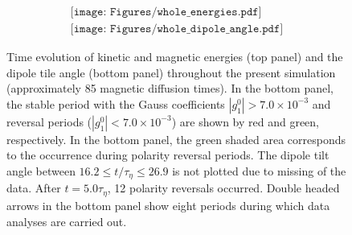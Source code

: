 \begin{figure}[ht]
\begin{center}
\[
\begin{array}{c}
\texttt{[image: Figures/whole\_energies.pdf]} \\
\texttt{[image: Figures/whole\_dipole\_angle.pdf]}
\end{array}
\]
\end{center}
\caption{
Time evolution of kinetic and magnetic energies (top panel) and the dipole tile angle (bottom panel) throughout the present simulation (approximately 85 magnetic diffusion times). In the bottom panel, the stable period with the Gauss coefficients $|g_{1}^{0}| > 7.0 \times 10^{-3}$ and reversal periods ($|g_{1}^{0}| < 7.0 \times 10^{-3}$) are shown by red and green, respectively. 
In the bottom panel, the green shaded area corresponds to the occurrence during polarity reversal periods.
The dipole tilt angle between $16.2 \le t / \tau_{\eta} \le 26.9$ is not plotted due to missing of the data. 
After $t = 5.0 \tau_{\eta}$, 12 polarity reversals occurred.
Double headed arrows in the bottom panel show eight periods during which data analyses are carried out.
}
\label{fig:sph_shell_275_full}
\end{figure}